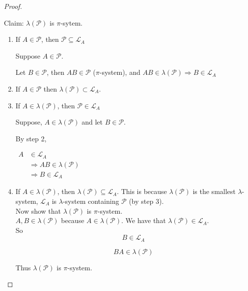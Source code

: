 \documentclass[11pt,fleqn]{book} %
\begin{document}
\begin{proof}
\begin{enumerate}
\begin{enumerate}
		\end{enumerate}

	Claim: $\lambda(\mathcal{P})$ is $\pi$-sytem.

	\begin{enumerate}
		\item If $A \in \mathcal{P}$, then $\mathcal{P} \subseteq \mathcal{L}_A$

	Suppose $A \in \mathcal{P}$.

	Let $B \in \mathcal{P}$, then $AB \in \mathcal{P}$ ($\pi$-system), and $AB \in \lambda(\mathcal{P}) \Rightarrow B \in \mathcal{L}_A$

		\item If $A \in \mathcal{P}$ then $\lambda(\mathcal{P}) \subset \mathcal{L}_A$.

		\item If $A \in \lambda(\mathcal{P})$, then $\mathcal{P} \in \mathcal{L}_A$

		Suppose, $A \in \lambda(\mathcal{P})$ and let $B \in \mathcal{P}$. 

		By step 2,


			$\begin{aligned}
				A &\in \mathcal{L}_A\\
					&\Rightarrow AB \in \lambda(\mathcal{P})\\
					&\Rightarrow B \in \mathcal{L}_A	
			\end{aligned}$

		\item If $A \in \lambda(\mathcal{P})$, then $\lambda(\mathcal{P}) \subseteq \mathcal{L}_A$. This is because $\lambda(\mathcal{P})$ is the smallest $\lambda$-system, $\mathcal{L}_A$ is $\lambda$-system containing $\mathcal{P}$ (by step 3).\\

		Now show that $\lambda(\mathcal{P})$ is $\pi$-system.\\

		$A, B \in \lambda(\mathcal{P})$ because $A \in \lambda(\mathcal{P})$. We have that $\lambda(\mathcal{P}) \in \mathcal{L}_A$.\\

		So 
		$$B \in \mathcal{L}_A $$ 

		$$BA \in \lambda(\mathcal{P})$$

		Thus $\lambda(\mathcal{P})$ is $\pi$-system.
	\end{enumerate}
	\end{enumerate}
\end{proof}
\end{document}
